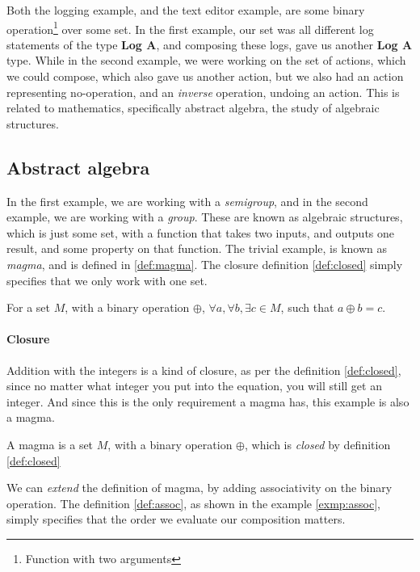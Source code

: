 Both the logging example, and the text editor example, are some binary operation\footnote{Function with two arguments}
over some set. In the first example, our set was all different log statements of
the type \textbf{Log A}, and composing these logs, gave us another
\textbf{Log A} type. While in the second example, we were working on the set of
actions, which we could compose, which also gave us another action, but we also
had an action representing no-operation, and an \textit{inverse} operation,
undoing an action. This is related to mathematics, specifically abstract
algebra, the study of algebraic structures.

\subsection{Abstract algebra}

In the first example, we are working with a \textit{semigroup}, and in the
second example, we are working with a \textit{group}. These are known as
algebraic structures, which is just some set, with a function that takes two
inputs, and outputs one result, and some property on that function. The trivial
example, is known as \textit{magma}, and is defined in \ref{def:magma}. The
closure definition \ref{def:closed} simply specifies that we only work with one
set.

\begin{definition}[Closure] \label{def:closed}
  For a set $M$, with a binary operation $\oplus$,
  $\forall a, \forall b, \exists c \in M$, such that
  $a \oplus b = c$.
\end{definition}

\paragraph{Closure} Addition with the integers is a kind of closure, as per the
definition \ref{def:closed}, since no matter what integer you put into the
equation, you will still get an integer. And since this is the only requirement a
magma has, this example is also a magma.

\begin{definition}[Magma] \label{def:magma}
  A magma is a set $M$, with a binary operation $\oplus$, which is
  \textit{closed} by definition \ref{def:closed}
\end{definition}

We can \textit{extend} the definition of magma, by adding associativity on the
binary operation. The definition \ref{def:assoc}, as shown in the example
\ref{exmp:assoc},
simply specifies that the order we evaluate our composition matters.

